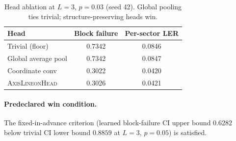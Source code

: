 \documentclass[11pt,a4paper]{article}
\begin{document}
\begin{table}[t]
\centering
\small
\caption{Head ablation at $L=3$, $p=0.03$ (seed 42). Global pooling ties
trivial; structure-preserving heads win.}
\label{tab:ablation}
\begin{tabular}{lcc}
\toprule
Head & Block failure & Per-sector LER \\
\midrule
Trivial (floor)        & 0.7342 & 0.0846 \\
Global average pool    & 0.7342 & 0.0847 \\
Coordinate conv        & 0.3022 & 0.0420 \\
\textsc{AxisLineonHead}& 0.3026 & 0.0421 \\
\bottomrule
\end{tabular}
\end{table}

\paragraph{Predeclared win condition.} The fixed-in-advance criterion
(learned block-failure CI upper bound $0.6282$ below trivial CI lower bound
$0.8859$ at $L=3$, $p=0.05$) is satisfied.
\end{document}
